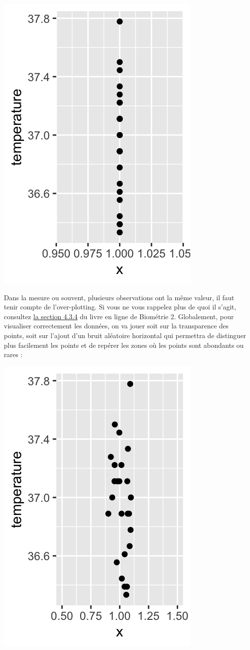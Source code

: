 \documentclass[a4paperpaper,]{article}
\newenvironment{Shaded}{\begin{snugshade}}{\end{snugshade}}
\newcommand{\DataTypeTok}[1]{\textcolor[rgb]{0.00,0.34,0.68}{#1}}
\newcommand{\DecValTok}[1]{\textcolor[rgb]{0.69,0.50,0.00}{#1}}
\newcommand{\FloatTok}[1]{\textcolor[rgb]{0.69,0.50,0.00}{#1}}
\newcommand{\KeywordTok}[1]{\textcolor[rgb]{0.12,0.11,0.11}{\textbf{#1}}}
\newcommand{\NormalTok}[1]{\textcolor[rgb]{0.12,0.11,0.11}{#1}}
\newcommand{\OperatorTok}[1]{\textcolor[rgb]{0.12,0.11,0.11}{#1}}
\newcommand{\StringTok}[1]{\textcolor[rgb]{0.75,0.01,0.01}{#1}}
\begin{document}
\begin{center}\includegraphics[width=0.25\linewidth]{figure/unnamed-chunk-15-1} \end{center}

Dans la mesure ou souvent, plusieurs observations ont la même valeur, il faut tenir compte de l'over-plotting. Si vous ne vous rappelez plus de quoi il s'agit, consultez \href{https://besibo.github.io/DA/viz.html\#over-plotting}{la section 4.3.4} du livre en ligne de Biométrie 2. Globalement, pour visualiser correctement les données, on va jouer soit sur la transparence des points, soit sur l'ajout d'un bruit aléatoire horizontal qui permettra de distinguer plus facilement les points et de repérer les zones où les points sont abondants ou rares :

\begin{Shaded}
\end{Shaded}

\begin{center}\includegraphics[width=0.25\linewidth]{figure/unnamed-chunk-16-1} \end{center}
\end{document}
